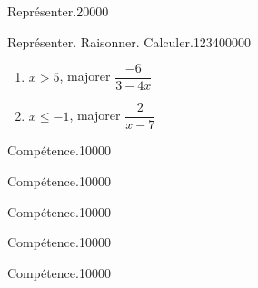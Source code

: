 \begin{pageParcourst}
\begin{ExoCtN}{Représenter.}{2}{0}{0}{0}{0}
\end{ExoCtN}

\begin{ExoCt}{Représenter. Raisonner. Calculer.}{1234}{0}{0}{0}{0}{0}

\begin{enumerate}
\item $x > 5 $, majorer $\dfrac{-6}{3-4x}$ 
\item $x \leq -1$, majorer $\dfrac{2}{x-7}$
\end{enumerate}

\end{ExoCt}
 
\end{pageParcourst} %


\begin{pageAuto} %

\begin{ExoAutoN}{Compétence.}{1}{0}{0}{0}{0}

\end{ExoAutoN}

\begin{ExoAutoN}{Compétence.}{1}{0}{0}{0}{0}

\end{ExoAutoN}


\begin{ExoAutoN}{Compétence.}{1}{0}{0}{0}{0}

\end{ExoAutoN}

\end{pageAuto} %


\begin{pageAlgo} %

\begin{ExoAlgoN}{Compétence.}{1}{0}{0}{0}{0}

\end{ExoAlgoN}

\begin{ExoAlgo}{Compétence.}{1}{0}{0}{0}{0}

\end{ExoAlgo}

\end{pageAlgo} %

